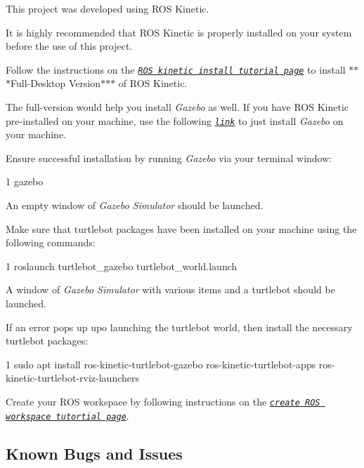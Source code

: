 \begin{DoxyItemize}
\item This project was developed using R\+OS Kinetic.
\item It is highly recommended that R\+OS Kinetic is properly installed on your system before the use of this project.
\item Follow the instructions on the \href{http://wiki.ros.org/kinetic/Installation/Ubuntu}{\tt {\itshape R\+OS kinetic install tutorial page}} to install $\ast$$\ast$$\ast$\+Full-\/\+Desktop Version$\ast$$\ast$$\ast$ of R\+OS Kinetic.
\item The full-\/version would help you install {\itshape Gazebo} as well. If you have R\+OS Kinetic pre-\/installed on your machine, use the following \href{http://gazebosim.org/tutorials?tut=install_ubuntu&cat=install}{\tt {\itshape link}} to just install {\itshape Gazebo} on your machine.
\item Ensure successful installation by running {\itshape Gazebo} via your terminal window\+: 
\begin{DoxyCode}
1 gazebo
\end{DoxyCode}

\item An empty window of {\itshape Gazebo Simulator} should be launched.
\item Make sure that turtlebot packages have been installed on your machine using the following commands\+: 
\begin{DoxyCode}
1 roslaunch turtlebot\_gazebo turtlebot\_world.launch
\end{DoxyCode}

\item A window of {\itshape Gazebo Simulator} with various items and a turtlebot should be launched.
\item If an error pops up upo launching the turtlebot world, then install the necessary turtlebot packages\+: 
\begin{DoxyCode}
1 sudo apt install ros-kinetic-turtlebot-gazebo ros-kinetic-turtlebot-apps
       ros-kinetic-turtlebot-rviz-launchers
\end{DoxyCode}

\item Create your R\+OS workspace by following instructions on the \href{http://wiki.ros.org/catkin/Tutorials/create_a_workspace}{\tt {\itshape create R\+OS workspace tutortial page}}.
\end{DoxyItemize}

\subsection*{Known Bugs and Issues}

